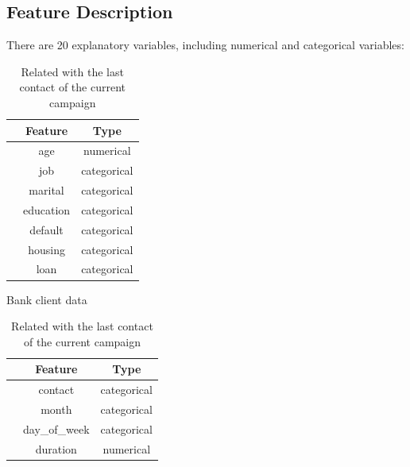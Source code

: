 \documentclass[11pt,a4paper]{article}
\newcounter{magicrownumbers}
\newcommand\rownumber{\stepcounter{magicrownumbers}\arabic{magicrownumbers}}
\begin{document}
    
    \subsection{Feature Description}
    There are 20 explanatory variables, including numerical and categorical variables:
    
    \begin{table}[h]
        \begin{minipage}{.5\linewidth}
            \centering
            \begin{tabular}{r c c}
                 & Feature & Type \\
                \hline \hline
                \rownumber & age & numerical \\
                \rownumber & job & categorical \\
                \rownumber & marital & categorical \\
                \rownumber & education & categorical \\
                \rownumber & default & categorical \\
                \rownumber & housing & categorical \\
                \rownumber & loan & categorical \\
            \end{tabular}
            \caption{Bank client data}\label{tab:bank.client}
        \end{minipage}%
        \begin{minipage}{.5\linewidth}
            \centering
            \begin{tabular}{r c c}
                 & Feature & Type \\
                \hline \hline
                \rownumber & contact & categorical \\
                \rownumber & month & categorical \\
                \rownumber & day\_of\_week & categorical \\
                \rownumber & duration & numerical \\
            \end{tabular}
            \caption{Related with the last contact of the current campaign}\label{tab:last.contact}
        \end{minipage}
    \end{table}
    
\end{document}
